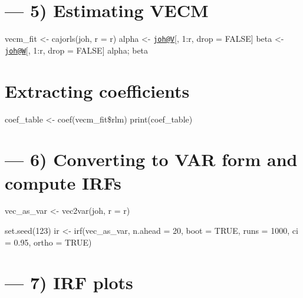 \documentclass[
]{article}
\begin{document}
\section{--- 5) Estimating VECM}\label{estimating-vecm}

vecm\_fit \textless- cajorls(joh, r = r) alpha \textless-
\href{mailto:joh@V}{\nolinkurl{joh@V}}{[}, 1:r, drop = FALSE{]} beta
\textless- \href{mailto:joh@W}{\nolinkurl{joh@W}}{[}, 1:r, drop =
FALSE{]} alpha; beta

\section{Extracting coefficients}\label{extracting-coefficients}

coef\_table \textless- coef(vecm\_fit\$rlm) print(coef\_table)

\section{--- 6) Converting to VAR form and compute
IRFs}\label{converting-to-var-form-and-compute-irfs}

vec\_as\_var \textless- vec2var(joh, r = r)

set.seed(123) ir \textless- irf(vec\_as\_var, n.ahead = 20, boot = TRUE,
runs = 1000, ci = 0.95, ortho = TRUE)

\section{--- 7) IRF plots}\label{irf-plots}
\end{document}
